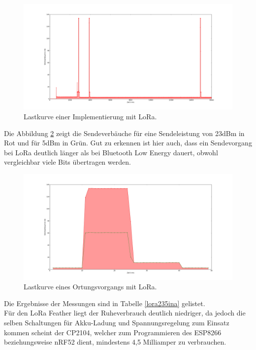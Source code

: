 \begin{figure}[h!]
  \centering
	\includegraphics[width=\textwidth]{plots/lora23.png}
  \caption{Lastkurve einer Implementierung mit LoRa.}
  \label{fig:lora23}
\end{figure}

Die Abbildung \ref{fig:lora235send} zeigt die Sendeverbäuche für eine Sendeleistung von 23dBm in Rot und für 5dBm in Grün.
Gut zu erkennen ist hier auch, dass ein Sendevorgang bei LoRa deutlich länger als bei Bluetooth Low Energy dauert, obwohl vergleichbar viele Bits übertragen werden.

\begin{figure}[h!]
  \centering
	\includegraphics[width=\textwidth]{plots/lora235send.png}
  \caption{Lastkurve eines Ortungsvorgangs mit LoRa.}
  \label{fig:lora235send}
\end{figure}

Die Ergebnisse der Messungen sind in Tabelle \ref{lora235ina} gelistet.\\
Für den LoRa Feather liegt der Ruheverbrauch deutlich niedriger, da jedoch die selben Schaltungen für Akku-Ladung und Spannungsregelung zum Einsatz kommen scheint der CP2104, welcher zum Programmieren des ESP8266 beziehungsweise nRF52 dient, mindestens 4,5 Milliamper zu verbrauchen.

